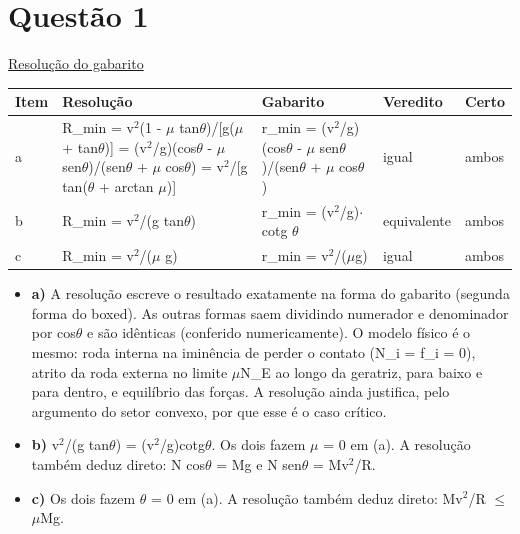 \documentclass{article}%
\begin{document}
\section*{Questão 1}%
\href{https://poliedroresolve.sistemapoliedro.com.br/vestibulares/ita/2026/ita-2-fase-dia-3-30-10-2025-2-fase-dia-3/dissertativa-1-fisica-2-fase-dia-3-ita-2026}{Resolução do gabarito}\par\smallskip%
\begin{longtable}{@{}p{} p{} p{} p{} p{}@{}}\toprule Item & Resolução & Gabarito & Veredito & Certo \\ \midrule
a & R\_min = v$^2$(1 - $\mu$ tan$\theta$)/{[}g($\mu$ + tan$\theta$){]} = (v$^2$/g)(cos$\theta$ - $\mu$ sen$\theta$)/(sen$\theta$ + $\mu$ cos$\theta$) = v$^2$/{[}g tan($\theta$ + arctan $\mu$){]} & r\_min = (v$^2$/g)(cos$\theta$ - $\mu$ sen$\theta$)/(sen$\theta$ + $\mu$ cos$\theta$) & igual & ambos \\
b & R\_min = v$^2$/(g tan$\theta$) & r\_min = (v$^2$/g)$\cdot$cotg $\theta$ & equivalente & ambos \\
c & R\_min = v$^2$/($\mu$ g) & r\_min = v$^2$/($\mu$g) & igual & ambos \\
\bottomrule\end{longtable}%
\begin{itemize}%
\item%
\textbf{a)} A resolução escreve o resultado exatamente na forma do gabarito (segunda forma do boxed). As outras formas saem dividindo numerador e denominador por cos$\theta$ e são idênticas (conferido numericamente). O modelo físico é o mesmo: roda interna na iminência de perder o contato (N\_i = f\_i = 0), atrito da roda externa no limite $\mu$N\_E ao longo da geratriz, para baixo e para dentro, e equilíbrio das forças. A resolução ainda justifica, pelo argumento do setor convexo, por que esse é o caso crítico.%
\item%
\textbf{b)} v$^2$/(g tan$\theta$) = (v$^2$/g)cotg$\theta$. Os dois fazem $\mu$ = 0 em (a). A resolução também deduz direto: N cos$\theta$ = Mg e N sen$\theta$ = Mv$^2$/R.%
\item%
\textbf{c)} Os dois fazem $\theta$ = 0 em (a). A resolução também deduz direto: Mv$^2$/R $\leq$ $\mu$Mg.%
\end{itemize}%
\end{document}
